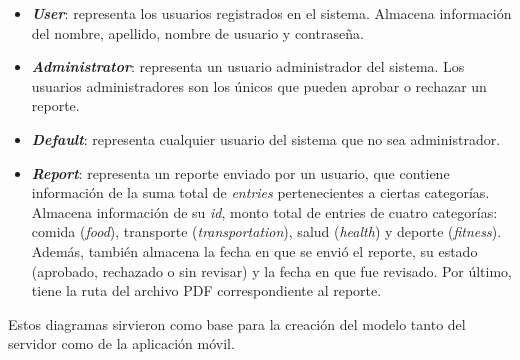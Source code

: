 \begin{itemize}
	\item \textbf{\textit{User}}: representa los usuarios registrados en el sistema. Almacena información del nombre, apellido, nombre de usuario y contraseña. 
	\item \textbf{\textit{Administrator}}: representa un usuario administrador del sistema. Los usuarios administradores son los únicos que pueden aprobar o rechazar un reporte.
	\item \textbf{\textit{Default}}: representa cualquier usuario del sistema que no sea administrador.
	\item \textbf{\textit{Report}}: representa un reporte enviado por un usuario, que contiene información de la suma total de \textit{entries} pertenecientes a ciertas categorías. Almacena información de su \textit{id}, monto total de entries de cuatro categorías: comida (\textit{food}), transporte (\textit{transportation}), salud (\textit{health}) y deporte (\textit{fitness}). Además, también almacena la fecha en que se envió el reporte, su estado (aprobado, rechazado o sin revisar) y la fecha en que fue revisado. Por último, tiene la ruta del archivo PDF correspondiente al reporte.
\end{itemize} 

Estos diagramas sirvieron como base para la creación del modelo tanto del servidor como de la aplicación móvil. 
%
%
%
%
%
